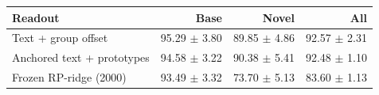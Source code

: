\begin{tabular}{lrrr}
\toprule
Readout & Base & Novel & All \\
\midrule
Text + group offset & 95.29 $\pm$ 3.80 & 89.85 $\pm$ 4.86 & 92.57 $\pm$ 2.31 \\
Anchored text + prototypes & 94.58 $\pm$ 3.22 & 90.38 $\pm$ 5.41 & 92.48 $\pm$ 1.10 \\
Frozen RP-ridge (2000) & 93.49 $\pm$ 3.32 & 73.70 $\pm$ 5.13 & 83.60 $\pm$ 1.13 \\
\bottomrule
\end{tabular}